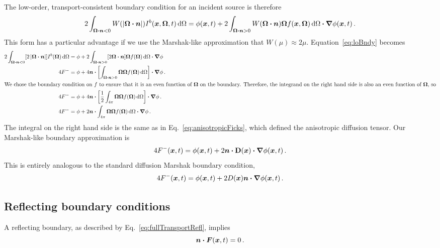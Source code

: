 The low-order, transport-consistent boundary condition for an incident source
is therefore
\begin{equation}\label{eq:loBndy}
  2\int_{\bm{\Omega}\bm{\cdot} \bm{n} < 0}
  W(\left| \bm{\Omega} \bm{\cdot} \bm{n} \right|) I^b(\bm{x}, \bm{\Omega}, t) \mathop{}\!\mathrm{d}\Omega
  = \phi(\bm{x}, t)
  + 2\int_{\bm{\Omega}\bm{\cdot} \bm{n} > 0} W(\bm{\Omega} \bm{\cdot} \bm{n})
  \bm{\Omega} f(\bm{x}, \bm{\Omega}) \mathop{}\!\mathrm{d}\Omega
  \bm{\cdot} \bm{\nabla} \phi(\bm{x}, t) \,.
\end{equation}
This form has a particular advantage if we use the Marshak-like approximation
that $W(\mu)\approx 2\mu$. Equation~\eqref{eq:loBndy} becomes
\begin{align*}
  2\int_{\bm{\Omega}\bm{\cdot} \bm{n} < 0}
  [2\left| \bm{\Omega} \bm{\cdot} \bm{n} \right|] I^b(\bm{\Omega}) \mathop{}\!\mathrm{d}\Omega
  &= \phi
  + 2\int_{\bm{\Omega}\bm{\cdot} \bm{n} > 0} [2\bm{\Omega} \bm{\cdot} \bm{n}]
  \bm{\Omega} f(\bm{\Omega}) \mathop{}\!\mathrm{d}\Omega \bm{\cdot} \bm{\nabla} \phi
  \\
  4 F^-
  &= \phi
  + 4 \bm{n} \bm{\cdot} \left[ \int_{\bm{\Omega}\bm{\cdot} \bm{n} > 0} \bm{\Omega}
  \bm{\Omega} f(\bm{\Omega}) \mathop{}\!\mathrm{d}\Omega \right] \bm{\cdot} \bm{\nabla} \phi \,.
  \\ 
  \intertext{We chose the boundary condition on $f$ to ensure that it is an
  even function of $\bm{\Omega}$ on the boundary. Therefore, the integrand on
  the right hand side is also an even function of $\bm{\Omega}$, so}
  4 F^-
  &= \phi
  + 4 \bm{n} \bm{\cdot}  \left[ \frac{1}{2} \int_{4\pi}
  \bm{\Omega} \bm{\Omega} f(\bm{\Omega}) \mathop{}\!\mathrm{d}\Omega \right] \bm{\cdot} \bm{\nabla} \phi \,.
  \\
  4 F^-
  &= \phi
  + 2 \bm{n} \bm{\cdot} \int_{4\pi}
  \bm{\Omega} \bm{\Omega} f(\bm{\Omega}) \mathop{}\!\mathrm{d}\Omega \bm{\cdot} \bm{\nabla} \phi \,.
\end{align*}
The integral on the right hand side is the same as in
  Eq.~\eqref{eq:anisotropicFicks}, which defined the anisotropic diffusion
  tensor. Our Marshak-like boundary approximation is
\begin{equation}\label{eq:marshakAd}
  4 F^-(\bm{x}, t)
  = \phi(\bm{x}, t)
  + 2 \bm{n} \bm{\cdot} \mathbf{D}(\bm{x}) \bm{\cdot} \bm{\nabla} \phi(\bm{x}, t) \,.
\end{equation}
This is entirely analogous to the standard diffusion Marshak boundary condition,
\begin{equation*}
  4 F^-(\bm{x}, t) = \phi(\bm{x}, t)
  + 2  D(\bm{x}) \bm{n} \bm{\cdot} \bm{\nabla} \phi(\bm{x}, t)\,.
\end{equation*}

\subsection{Reflecting boundary conditions}
A reflecting boundary, as described by Eq.~\eqref{eq:fullTransportRefl}, 
implies
\begin{equation}\label{eq:reflFirst}
  \bm{n} \bm{\cdot} \bm{F}(\bm{x}, t) = 0\,.
\end{equation}

